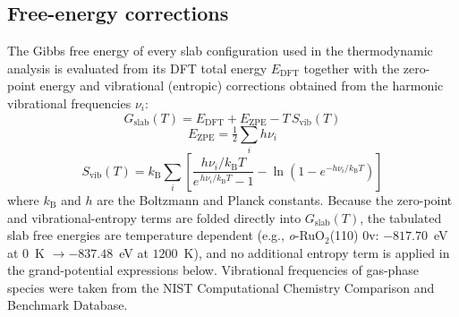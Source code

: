 \subsection*{Free-energy corrections}
The Gibbs free energy of every slab configuration used in the thermodynamic
analysis is evaluated from its DFT total energy $E_{\mathrm{DFT}}$ together with
the zero-point energy and vibrational (entropic) corrections obtained from the
harmonic vibrational frequencies $\nu_i$:
\begin{equation}
  G_{\mathrm{slab}}(T) = E_{\mathrm{DFT}} + E_{\mathrm{ZPE}}
  - T\,S_{\mathrm{vib}}(T)
  \label{eq:Gslab}
\end{equation}
\begin{equation}
  E_{\mathrm{ZPE}} = \tfrac{1}{2}\sum_i h\nu_i
  \label{eq:ZPE}
\end{equation}
\begin{equation}
  S_{\mathrm{vib}}(T) = k_{\mathrm B}\sum_i\left[
    \frac{h\nu_i/k_{\mathrm B}T}{e^{\,h\nu_i/k_{\mathrm B}T}-1}
    - \ln\!\left(1-e^{-h\nu_i/k_{\mathrm B}T}\right)\right]
  \label{eq:Svib}
\end{equation}
where $k_{\mathrm B}$ and $h$ are the Boltzmann and Planck constants. Because the
zero-point and vibrational-entropy terms are folded directly into
$G_{\mathrm{slab}}(T)$, the tabulated slab free energies are temperature
dependent (e.g., \textit{o}-RuO$_2$(110) 0v: $-817.70$~eV at $0$~K
$\rightarrow -837.48$~eV at $1200$~K), and no additional entropy term is applied
in the grand-potential expressions below. Vibrational frequencies of gas-phase
species were taken from the NIST Computational Chemistry Comparison and Benchmark
Database.

